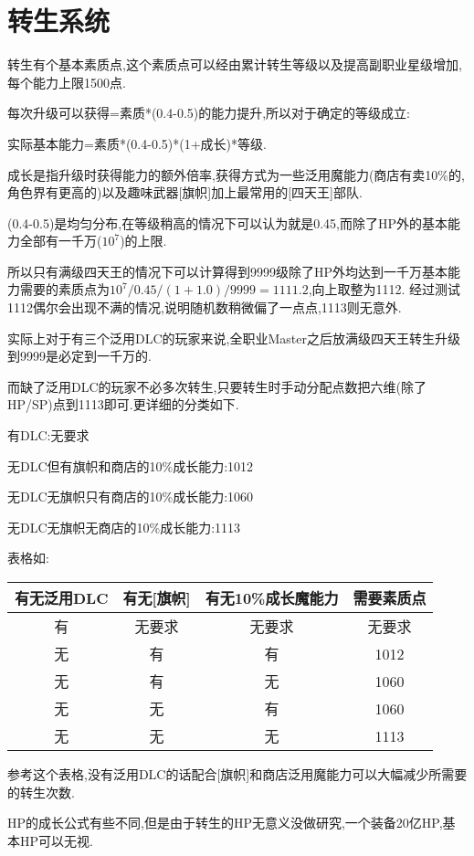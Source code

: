 
\newpage

\section{转生系统}

转生有个基本素质点,这个素质点可以经由累计转生等级以及提高副职业星级增加,每个能力上限1500点.

每次升级可以获得=素质*(0.4-0.5)的能力提升,所以对于确定的等级成立:

实际基本能力=素质*(0.4-0.5)*(1+成长)*等级.

成长是指升级时获得能力的额外倍率,获得方式为一些泛用魔能力(商店有卖10\%的,角色界有更高的)以及趣味武器[旗帜]加上最常用的[四天王]部队.

(0.4-0.5)是均匀分布,在等级稍高的情况下可以认为就是0.45,而除了HP外的基本能力全部有一千万($10^7$)的上限.

所以只有满级四天王的情况下可以计算得到9999级除了HP外均达到一千万基本能力需要的素质点为$10^7/0.45/(1+1.0)/9999=1111.2$,向上取整为1112.
经过测试1112偶尔会出现不满的情况,说明随机数稍微偏了一点点,1113则无意外.

实际上对于有三个泛用DLC的玩家来说,全职业Master之后放满级四天王转生升级到9999是必定到一千万的.

而缺了泛用DLC的玩家不必多次转生,只要转生时手动分配点数把六维(除了HP/SP)点到1113即可.更详细的分类如下.

有DLC:无要求

无DLC但有旗帜和商店的10\%成长能力:1012

无DLC无旗帜只有商店的10\%成长能力:1060

无DLC无旗帜无商店的10\%成长能力:1113

表格如:

\begin{center}
	\begin{tabular}
	{| c | c | c | c |}
	\hline
	有无泛用DLC & 有无[旗帜] & 有无10\%成长魔能力 & 需要素质点\\
	\hline
	有 & 无要求 & 无要求 & 无要求\\
	\hline
	无 & 有 & 有 & 1012\\
	\hline
	无 & 有 & 无 & 1060\\
	\hline
	无 & 无 & 有 & 1060\\
	\hline
	无 & 无 & 无 & 1113\\
	\hline
	\end{tabular}
\end{center}

参考这个表格,没有泛用DLC的话配合[旗帜]和商店泛用魔能力可以大幅减少所需要的转生次数.

HP的成长公式有些不同,但是由于转生的HP无意义没做研究,一个装备20亿HP,基本HP可以无视.
